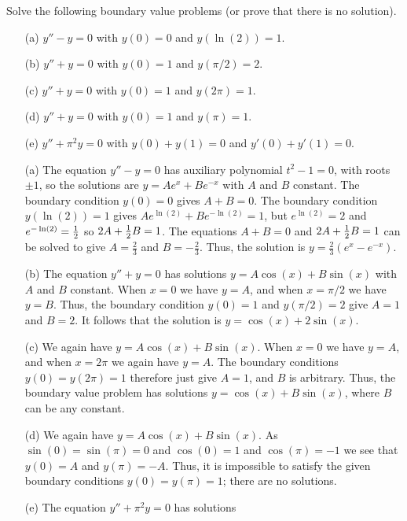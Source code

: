 \documentclass[a4paper]{amsart}
\begin{document}
\begin{exercise}\label{ex-boundary}
 Solve the following boundary value problems (or prove that there is
 no solution).
 \begin{itemize}
  \item[(a)] $y''-y=0$ with $y(0)=0$ and $y(\ln(2))=1$.
  \item[(b)] $y''+y=0$ with $y(0)=1$ and $y(\pi/2)=2$.
  \item[(c)] $y''+y=0$ with $y(0)=1$ and $y(2\pi)=1$.
  \item[(d)] $y''+y=0$ with $y(0)=1$ and $y(\pi)=1$.
  \item[(e)] $y''+\pi^2y=0$ with $y(0)+y(1)=0$ and $y'(0)+y'(1)=0$.
 \end{itemize}
\end{exercise}
\begin{solution}\leavevmode
 \begin{itemize}
  \item[(a)] The equation $y''-y=0$ has auxiliary polynomial
   $t^2-1=0$, with roots $\pm 1$, so the solutions are $y=Ae^x+Be^{-x}$
   with $A$ and $B$ constant.  The boundary condition $y(0)=0$ gives
   $A+B=0$.  The boundary condition $y(\ln(2))=1$ gives
   $Ae^{\ln(2)}+Be^{-\ln(2)}=1$, but $e^{\ln(2)}=2$ and
   $e^{-\ln(2)}=\tfrac{1}{2}$ so $2A+\tfrac{1}{2} B=1$.  The equations $A+B=0$ and
   $2A+\tfrac{1}{2} B=1$ can be solved to give $A=\frac{2}{3}$ and
   $B=-\frac{2}{3}$.  Thus, the solution is $y=\frac{2}{3}(e^x-e^{-x})$.
  \item[(b)] The equation $y''+y=0$ has solutions
   $y=A\cos(x)+B\sin(x)$ with $A$ and $B$ constant.  When $x=0$ we
   have $y=A$, and when $x=\pi/2$ we have $y=B$.  Thus, the boundary
   condition $y(0)=1$ and $y(\pi/2)=2$ give $A=1$ and $B=2$.  It
   follows that the solution is $y=\cos(x)+2\sin(x)$.
  \item[(c)] We again have $y=A\cos(x)+B\sin(x)$.  When $x=0$ we have
   $y=A$, and when $x=2\pi$ we again have $y=A$.  The boundary
   conditions $y(0)=y(2\pi)=1$ therefore just give $A=1$, and $B$ is
   arbitrary.  Thus, the boundary value problem has solutions
   $y=\cos(x)+B\sin(x)$, where $B$ can be any constant.
  \item[(d)] We again have $y=A\cos(x)+B\sin(x)$.  As
   $\sin(0)=\sin(\pi)=0$ and $\cos(0)=1$ and $\cos(\pi)=-1$ we see
   that $y(0)=A$ and $y(\pi)=-A$.  Thus, it is impossible to satisfy
   the given boundary conditions $y(0)=y(\pi)=1$; there are no
   solutions.
  \item[(e)] The equation $y''+\pi^2y=0$ has solutions

\end{itemize}
\end{solution}
\end{document}
